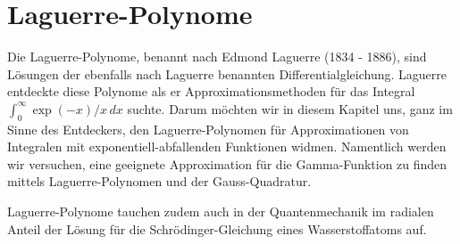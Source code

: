 %
%
%
\chapter{Laguerre-Polynome\label{chapter:laguerre}}
\begin{refsection}

{\parindent0pt Die} Laguerre\--Polynome, 
benannt nach Edmond Laguerre (1834 - 1886),
sind Lösungen der ebenfalls nach Laguerre benannten Differentialgleichung.
Laguerre entdeckte diese Polynome als er Approximationsmethoden 
für das Integral $\int_0^\infty \exp(-x) / x \, dx$ suchte.
Darum möchten wir in diesem Kapitel uns, 
ganz im Sinne des Entdeckers,
den Laguerre-Polynomen für Approximationen von Integralen mit 
exponentiell-abfallenden Funktionen widmen.
Namentlich werden wir versuchen, 
eine geeignete Approximation für die Gamma-Funktion zu finden 
mittels Laguerre-Polynomen und der Gauss-Quadratur.

Laguerre-Polynome tauchen zudem auch in der Quantenmechanik im radialen Anteil 
der Lösung für die Schrödinger-Gleichung eines Wasserstoffatoms auf.





% 
% 

\printbibliography[heading=subbibliography]
\end{refsection}
